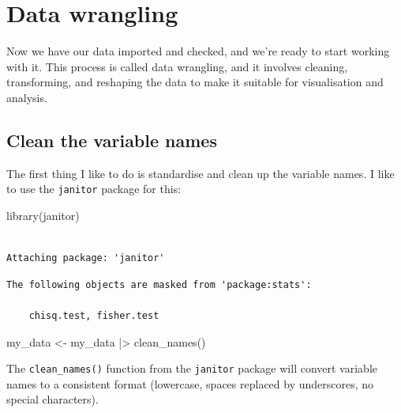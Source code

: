 \documentclass[
  letterpaper,
  8pt,
  a4paper]{book}
\newenvironment{Shaded}{\begin{snugshade}}{\end{snugshade}}
\newcommand{\FunctionTok}[1]{\textcolor[rgb]{0.28,0.35,0.67}{#1}}
\newcommand{\NormalTok}[1]{\textcolor[rgb]{0.00,0.23,0.31}{#1}}
\newcommand{\OtherTok}[1]{\textcolor[rgb]{0.00,0.23,0.31}{#1}}
\newcommand{\SpecialCharTok}[1]{\textcolor[rgb]{0.37,0.37,0.37}{#1}}
\begin{document}
\section*{Data wrangling}\label{data-wrangling}


Now we have our data imported and checked, and we're ready to start
working with it. This process is called data wrangling, and it involves
cleaning, transforming, and reshaping the data to make it suitable for
visualisation and analysis.

\subsection*{Clean the variable names}\label{clean-the-variable-names}

The first thing I like to do is standardise and clean up the variable
names. I like to use the \texttt{janitor} package for this:

\begin{Shaded}
\begin{Highlighting}[]
\FunctionTok{library}\NormalTok{(janitor)}
\end{Highlighting}
\end{Shaded}

\begin{verbatim}

Attaching package: 'janitor'
\end{verbatim}

\begin{verbatim}
The following objects are masked from 'package:stats':

    chisq.test, fisher.test
\end{verbatim}

\begin{Shaded}
\begin{Highlighting}[]
\NormalTok{my\_data }\OtherTok{\textless{}{-}}\NormalTok{ my\_data }\SpecialCharTok{|\textgreater{}} 
  \FunctionTok{clean\_names}\NormalTok{()}
\end{Highlighting}
\end{Shaded}

The \texttt{clean\_names()} function from the \texttt{janitor} package
will convert variable names to a consistent format (lowercase, spaces
replaced by underscores, no special characters).
\end{document}
